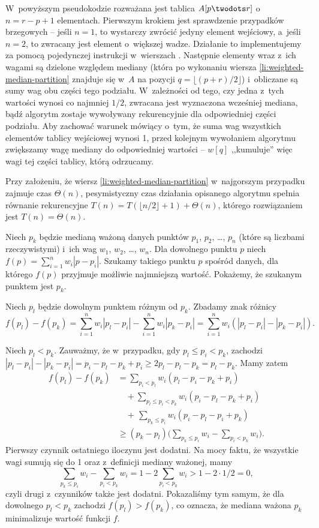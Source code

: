 W~powyższym pseudokodzie rozważana jest tablica $A[p\twodots r]$ o~$n=r-p+1$ elementach.
Pierwszym krokiem jest sprawdzenie przypadków brzegowych -- jeśli $n=1$, to wystarczy zwrócić jedyny element wejściowy, a~jeśli $n=2$, to zwracany jest element o~większej wadze.
Działanie to implementujemy za pomocą pojedynczej instrukcji  w~wierszach \doubledash{\ref{li:weighted-median-boundary-case-begin}}{\ref{li:weighted-median-boundary-case-end}}.
Następnie elementy wraz z~ich wagami są dzielone względem mediany (która po wykonaniu wiersza \ref{li:weighted-median-partition} znajduje się w~$A$ na pozycji $q=\lfloor(p+r)/2\rfloor$) i~obliczane są sumy wag obu części tego podziału.
W~zależności od tego, czy jedna z~tych wartości wynosi co najmniej $1/2$, zwracana jest wyznaczona wcześniej mediana, bądź algorytm zostaje wywoływany rekurencyjnie dla odpowiedniej części podziału.
Aby zachować warunek mówiący o~tym, że suma wag wszystkich elementów tablicy wejściowej wynosi 1, przed kolejnym wywołaniem algorytmu zwiększamy wagę mediany do odpowiedniej wartości -- $w[q]$ ,,kumuluje'' więc wagi tej części tablicy, którą odrzucamy.

Przy założeniu, że wiersz \ref{li:weighted-median-partition} w~najgorszym przypadku zajmuje czas $\Theta(n)$, pesymistyczny czas działania opisanego algorytmu spełnia równanie rekurencyjne $T(n)=T(\lfloor n/2\rfloor+1)+\Theta(n)$, którego rozwiązaniem jest $T(n)=\Theta(n)$.

\subproblem %
Niech $p_k$ będzie medianą ważoną danych punktów $p_1$, $p_2$, \dots, $p_n$ (które są liczbami rzeczywistymi) i~ich wag $w_1$, $w_2$, \dots, $w_n$.
Dla dowolnego punktu $p$ niech $f(p)=\sum_{i=1}^nw_i|p-p_i|$.
Szukamy takiego punktu $p$ spośród danych, dla którego $f(p)$ przyjmuje możliwie najmniejszą wartość.
Pokażemy, że szukanym punktem jest $p_k$.

Niech $p_l$ będzie dowolnym punktem różnym od $p_k$.
Zbadamy znak różnicy
\[
    f(p_l)-f(p_k) = \sum_{i=1}^nw_i|p_l-p_i|-\sum_{i=1}^nw_i|p_k-p_i| = \sum_{i=1}^nw_i(|p_l-p_i|-|p_k-p_i|).
\]

Niech $p_l<p_k$.
Zauważmy, że w~przypadku, gdy $p_l\le p_i<p_k$, zachodzi $|p_l-p_i|-|p_k-p_i|=p_i-p_l-p_k+p_i\ge2p_l-p_l-p_k=p_l-p_k$.
Mamy zatem
\begin{align*}
    f(p_l)-f(p_k) &= \sum_{p_i<p_l}w_i(p_l-p_i-p_k+p_i) \\
	&\quad {}+\!\!\!\sum_{p_l\le p_i<p_k}\!\!\!\!w_i(p_i-p_l-p_k+p_i) \\
	&\quad {}+\,\sum_{p_k\le p_i}w_i(p_i-p_l-p_i+p_k) \\
	&\ge (p_k-p_l)\biggl(\sum_{p_k\le p_i}w_i-\sum_{p_i<p_k}w_i\biggr).
\end{align*}
Pierwszy czynnik ostatniego iloczynu jest dodatni.
Na mocy faktu, że wszystkie wagi sumują się do 1 oraz z~definicji mediany ważonej, mamy
\[
    \sum_{p_k\le p_i}w_i-\sum_{p_i<p_k}w_i = 1-2\sum_{p_i<p_k}w_i > 1-2\cdot1/2 = 0,
\]
czyli drugi z~czynników także jest dodatni.
Pokazaliśmy tym samym, że dla dowolnego $p_l<p_k$ zachodzi $f(p_l)>f(p_k)$, co oznacza, że mediana ważona $p_k$ minimalizuje wartość funkcji $f$.


